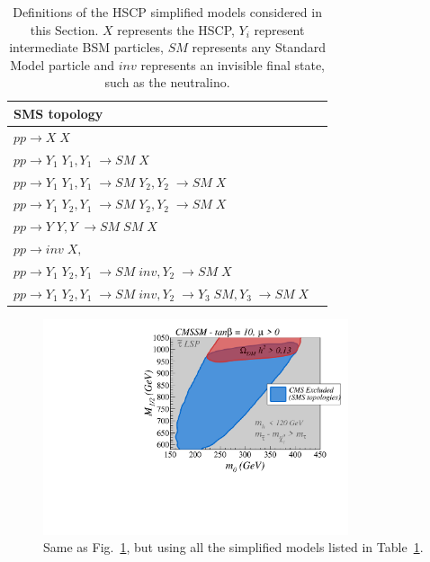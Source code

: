 \begin{table}
\begin{center}
\begin{tabular}{lc}
\toprule
SMS topology 
\\
\midrule
$pp \to X\;X$ 
\\
$pp \to Y_1\;Y_1, Y_1\;\to SM\;X$
\\
$pp \to Y_1\;Y_1, Y_1\;\to SM\; Y_2, Y_2\;\to SM\;X$
\\
$pp \to Y_1\;Y_2, Y_1\;\to SM\;Y_2, Y_2\;\to SM\; X$
\\
$pp \to Y\;Y, Y\;\to SM\;SM\;X$
\\
$pp \to inv\; X,$
\\
$pp \to Y_1\;Y_2, Y_1\;\to SM\;inv, Y_2\;\to SM\;X$
\\
$pp \to Y_1\;Y_2, Y_1\;\to SM\;inv, Y_2\;\to Y_3\;SM, Y_3\;\to SM\;X$
\\
\bottomrule
\end{tabular}
\end{center}
\caption{Definitions of the HSCP simplified models considered in this Section.
$X$ represents the HSCP, $Y_i$ represent intermediate BSM particles,
$SM$ represents any Standard Model particle and $inv$ represents an invisible
final state, such as the neutralino.}
\label{tab:defModels}
\end{table}



\begin{figure}[!h]
\centering
\includegraphics[width=0.8\textwidth]{ch5-figures/sms_exclusion_all.pdf}
\caption{Same as Fig.~\ref{fig:cmssmB}, but using all the simplified
models listed in Table~\ref{tab:defModels}.
}
\label{fig:cmssmB}
\end{figure}


